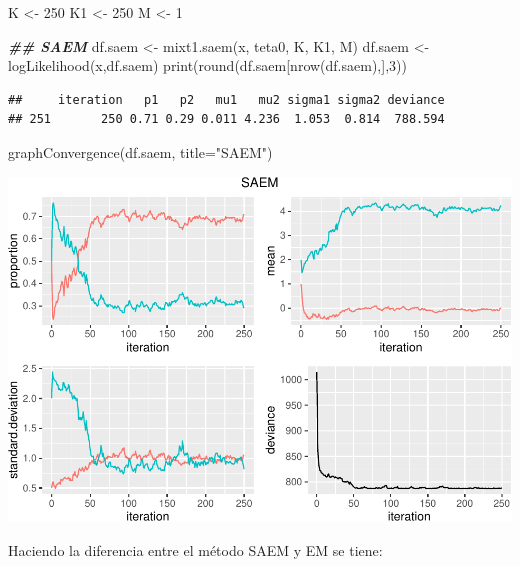 \documentclass[
]{article}
\newenvironment{Shaded}{\begin{snugshade}}{\end{snugshade}}
\newcommand{\AttributeTok}[1]{\textcolor[rgb]{0.77,0.63,0.00}{#1}}
\newcommand{\DecValTok}[1]{\textcolor[rgb]{0.00,0.00,0.81}{#1}}
\newcommand{\DocumentationTok}[1]{\textcolor[rgb]{0.56,0.35,0.01}{\textbf{\textit{#1}}}}
\newcommand{\FunctionTok}[1]{\textcolor[rgb]{0.00,0.00,0.00}{#1}}
\newcommand{\NormalTok}[1]{#1}
\newcommand{\OtherTok}[1]{\textcolor[rgb]{0.56,0.35,0.01}{#1}}
\newcommand{\SpecialCharTok}[1]{\textcolor[rgb]{0.00,0.00,0.00}{#1}}
\newcommand{\StringTok}[1]{\textcolor[rgb]{0.31,0.60,0.02}{#1}}
\begin{document}
\begin{Shaded}
\begin{Highlighting}[]
\NormalTok{K }\OtherTok{\textless{}{-}} \DecValTok{250}
\NormalTok{K1 }\OtherTok{\textless{}{-}} \DecValTok{250}
\NormalTok{M }\OtherTok{\textless{}{-}} \DecValTok{1}

\DocumentationTok{\#\#  SAEM}
\NormalTok{df.saem }\OtherTok{\textless{}{-}} \FunctionTok{mixt1.saem}\NormalTok{(x, teta0, K, K1, M)}
\NormalTok{df.saem }\OtherTok{\textless{}{-}} \FunctionTok{logLikelihood}\NormalTok{(x,df.saem)}
\FunctionTok{print}\NormalTok{(}\FunctionTok{round}\NormalTok{(df.saem[}\FunctionTok{nrow}\NormalTok{(df.saem),],}\DecValTok{3}\NormalTok{))}
\end{Highlighting}
\end{Shaded}

\begin{verbatim}
##     iteration   p1   p2   mu1   mu2 sigma1 sigma2 deviance
## 251       250 0.71 0.29 0.011 4.236  1.053  0.814  788.594
\end{verbatim}

\begin{Shaded}
\begin{Highlighting}[]
\FunctionTok{graphConvergence}\NormalTok{(df.saem, }\AttributeTok{title=}\StringTok{"SAEM"}\NormalTok{)}
\end{Highlighting}
\end{Shaded}

\includegraphics{Reporte0108_files/figure-latex/unnamed-chunk-10-1.pdf}

Haciendo la diferencia entre el método SAEM y EM se tiene:

\begin{Shaded}
\end{Shaded}
\end{document}
